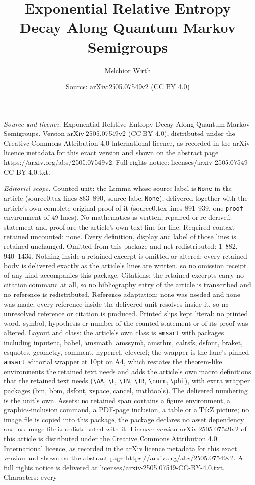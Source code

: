 \documentclass[10pt,a4paper]{amsart}
\title[Exponential Relative Entropy Decay Along Quantum Markov Semi]{Exponential Relative Entropy Decay Along Quantum Markov Semigroups}
\author{Melchior Wirth}
\date{Source: arXiv:2505.07549v2 (CC BY 4.0)}
\begin{document}
\maketitle

\noindent\emph{Source and licence.} Exponential Relative Entropy Decay Along Quantum Markov Semigroups. Version arXiv:2505.07549v2 (CC BY 4.0), distributed under the Creative Commons Attribution 4.0 International licence, as recorded in the arXiv licence metadata for this exact version and shown on the abstract page https://arxiv.org/abs/2505.07549v2. Full rights notice: licenses/arxiv-2505.07549-CC-BY-4.0.txt.\par\smallskip

\noindent\textit{Editorial scope.} Counted unit: the Lemma whose source label is \texttt{None} in the article (source0.tex lines 883--890, source label \texttt{None}), delivered together with the article's own complete original proof of it (source0.tex lines 891--939, one \texttt{proof} environment of 49 lines). No mathematics is written, repaired or re-derived: statement and proof are the article's own text line for line. Required context retained uncounted: none. Every definition, display and label of those lines is retained unchanged. Omitted from this package and not redistributed: 1--882, 940--1434. Nothing inside a retained excerpt is omitted or altered: every retained body is delivered exactly as the article's lines are written, so no omission receipt of any kind accompanies this package. Citations: the retained excerpts carry no citation command at all, so no bibliography entry of the article is transcribed and no reference is redistributed. Reference adaptation: none was needed and none was made; every reference inside the delivered unit resolves inside it, so no unresolved reference or citation is produced. Printed slips kept literal: no printed word, symbol, hypothesis or number of the counted statement or of its proof was altered. Layout and class: the article's own class is \texttt{amsart} with packages including inputenc, babel, amsmath, amssymb, amsthm, calrsfs, dsfont, braket, csquotes, geometry, comment, hyperref, cleveref; the wrapper is the lane's pinned \texttt{amsart} editorial wrapper at 10pt on A4, which restates the theorem-like environments the retained text needs and adds the article's own macro definitions that the retained text needs (\texttt{\textbackslash AA}, \texttt{\textbackslash E}, \texttt{\textbackslash IN}, \texttt{\textbackslash IR}, \texttt{\textbackslash norm}, \texttt{\textbackslash phi}), with extra wrapper packages (bm, bbm, dsfont, xspace, cancel, mathtools). The delivered numbering is the unit's own. Assets: no retained span contains a figure environment, a graphics-inclusion command, a PDF-page inclusion, a table or a TikZ picture; no image file is copied into this package, the package declares no asset dependency and no image file is redistributed with it. Licence: version arXiv:2505.07549v2 of this article is distributed under the Creative Commons Attribution 4.0 International licence, as recorded in the arXiv licence metadata for this exact version and shown on the abstract page https://arxiv.org/abs/2505.07549v2. A full rights notice is delivered at licenses/arxiv-2505.07549-CC-BY-4.0.txt. Characters: every 
\end{document}
